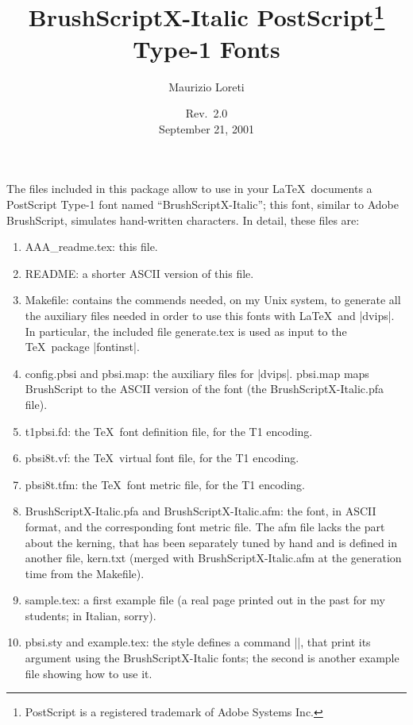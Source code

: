\documentclass[a4paper]{article}
\begin{document}
\title{BrushScriptX-Italic PostScript\thanks{PostScript is a
    registered trademark of Adobe Systems Inc.} \\
  Type-1 Fonts}
\author{\Large Maurizio Loreti}
\date{Rev.\ 2.0 \\
  September 21, 2001} \maketitle

The files included in this package allow to use in your
\LaTeX\ documents a PostScript Type-1 font named
``BrushScriptX-Italic''; this font, similar to Adobe
BrushScript, simulates hand-written characters.  In detail,
these files are:
\begin{enumerate}
\item AAA\_readme.tex: this file.
\item README: a shorter ASCII version of this file.
\item Makefile: contains the commends needed, on my Unix
  system, to generate all the auxiliary files needed in
  order to use this fonts with \LaTeX\ and |dvips|.  In
  particular, the included file generate.tex is used as
  input to the \TeX\ package |fontinst|.
\item config.pbsi and pbsi.map: the auxiliary files for
  |dvips|.  pbsi.map maps BrushScript to the ASCII version
  of the font (the BrushScriptX-Italic.pfa file).
\item t1pbsi.fd: the \TeX\ font definition file, for the T1
  encoding.
\item pbsi8t.vf: the \TeX\ virtual font file, for the T1
  encoding.
\item pbsi8t.tfm: the \TeX\ font metric file, for the T1
  encoding.
\item BrushScriptX-Italic.pfa and BrushScriptX-Italic.afm:
  the font, in ASCII format, and the corresponding font
  metric file.  The afm file lacks the part about the
  kerning, that has been separately tuned by hand and is
  defined in another file, kern.txt (merged with
  BrushScriptX-Italic.afm at the generation time from the
  Makefile).
\item sample.tex: a first example file (a real page printed
  out in the past for my students; in Italian, sorry).
\item pbsi.sty and example.tex: the style defines a command
  |\textbsi|, that print its argument using the
  BrushScriptX-Italic fonts; the second is another example
  file showing how to use it.
\end{enumerate}
\end{document}
